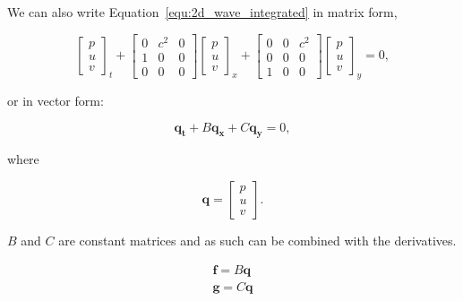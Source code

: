 We can also write Equation~\ref{equ:2d_wave_integrated} in matrix form,

\begin{equation} \label{equ:2d_wave_matrix}
	\begin{bmatrix}
        p \\ 
        u \\ 
        v
	\end{bmatrix}_t +
	\begin{bmatrix}
        0 & c^2 & 0 \\ 
        1 & 0 & 0 \\ 
        0 & 0 & 0
	\end{bmatrix}
	\begin{bmatrix}
        p\\ 
        u\\ 
        v
	\end{bmatrix}_x + 
	\begin{bmatrix}
        0 & 0 & c^2 \\ 
        0 & 0 & 0 \\ 
        1 & 0 & 0
	\end{bmatrix}
	\begin{bmatrix}
        p\\ 
        u\\ 
        v
	\end{bmatrix}_y = 0,
\end{equation}

\noindent
or in vector form:

\begin{equation} \label{equ:2d_wave_vector}
	\mathbf{q_t} + B \mathbf{q_x} + C \mathbf{q_y} = 0,
\end{equation}

\noindent
where

\begin{equation} \label{equ:q}
	\mathbf{q}  = 
    \begin{bmatrix}
        p\\ 
        u\\ 
        v
	\end{bmatrix}.
\end{equation}

\(B\) and \(C\) are constant matrices and as such can be combined with the derivatives.

\begin{gather}
	\mathbf{f} = B \mathbf{q} \\
	\mathbf{g} = C \mathbf{q}
\end{gather}

